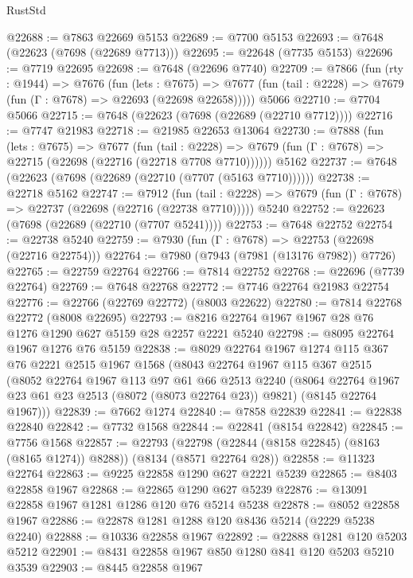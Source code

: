 \begin{lexlean}{RustStd}
\begin{coremodule}
@22688 := @7863 @22669 @5153
@22689 := @7700 @5153
@22693 := @7648 (@22623 (@7698 (@22689 @7713)))
@22695 := @22648 (@7735 @5153)
@22696 := @7719 @22695
@22698 := @7648 (@22696 @7740)
@22709 := @7866
    (fun (rty : @1944) =>
    @7676
      (fun (lets : @7675) =>
      @7677 (fun (tail : @2228) => @7679 (fun (Γ : @7678) => @22693 (@22698 @22658)))))
    @5066
@22710 := @7704 @5066
@22715 := @7648 (@22623 (@7698 (@22689 (@22710 @7712))))
@22716 := @7747 @21983
@22718 := @21985 @22653 @13064
@22730 := @7888
    (fun (lets : @7675) =>
    @7677
      (fun (tail : @2228) =>
      @7679 (fun (Γ : @7678) => @22715 (@22698 (@22716 (@22718 @7708 @7710))))))
    @5162
@22737 := @7648 (@22623 (@7698 (@22689 (@22710 (@7707 (@5163 @7710))))))
@22738 := @22718 @5162
@22747 := @7912
    (fun (tail : @2228) => @7679 (fun (Γ : @7678) => @22737 (@22698 (@22716 (@22738 @7710)))))
    @5240
@22752 := @22623 (@7698 (@22689 (@22710 (@7707 @5241))))
@22753 := @7648 @22752
@22754 := @22738 @5240
@22759 := @7930 (fun (Γ : @7678) => @22753 (@22698 (@22716 @22754)))
@22764 := @7980 (@7943 (@7981 (@13176 @7982)) @7726)
@22765 := @22759 @22764
@22766 := @7814 @22752
@22768 := @22696 (@7739 @22764)
@22769 := @7648 @22768
@22772 := @7746 @22764 @21983 @22754
@22776 := @22766 (@22769 @22772) (@8003 @22622)
@22780 := @7814 @22768 @22772 (@8008 @22695)
@22793 := @8216 @22764 @1967 @1967 @28 @76 @1276 @1290 @627 @5159 @28 @2257 @2221 @5240
@22798 := @8095 @22764 @1967 @1276 @76 @5159
@22838 := @8029
    @22764
    @1967
    @1274
    @115
    @367
    @76
    @2221
    @2515
    @1967
    @1568
    (@8043
      @22764
      @1967
      @115
      @367
      @2515
      (@8052
        @22764
        @1967
        @113
        @97
        @61
        @66
        @2513
        @2240
        (@8064 @22764 @1967 @23 @61 @23 @2513 (@8072 (@8073 @22764 @23)) @9821)
        (@8145 @22764 @1967)))
@22839 := @7662 @1274
@22840 := @7858 @22839
@22841 := @22838 @22840
@22842 := @7732 @1568
@22844 := @22841 (@8154 @22842)
@22845 := @7756 @1568
@22857 := @22793
    (@22798 (@22844 (@8158 @22845) (@8163 (@8165 @1274)) @8288))
    (@8134 (@8571 @22764 @28))
@22858 := @11323 @22764
@22863 := @9225 @22858 @1290 @627 @2221 @5239
@22865 := @8403 @22858 @1967
@22868 := @22865 @1290 @627 @5239
@22876 := @13091 @22858 @1967 @1281 @1286 @120 @76 @5214 @5238
@22878 := @8052 @22858 @1967
@22886 := @22878 @1281 @1288 @120 @8436 @5214 (@2229 @5238 @2240)
@22888 := @10336 @22858 @1967
@22892 := @22888 @1281 @120 @5203 @5212
@22901 := @8431 @22858 @1967 @850 @1280 @841 @120 @5203 @5210 @3539
@22903 := @8445 @22858 @1967

\end{coremodule}
\end{lexlean}
